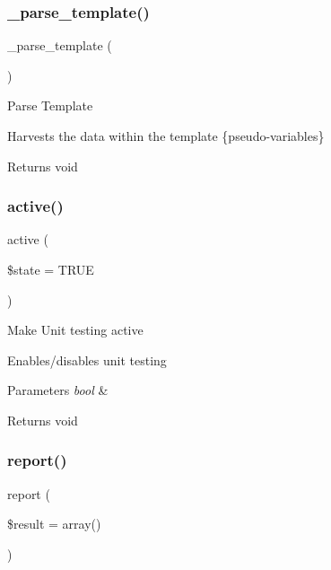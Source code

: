 \subsubsection{\texorpdfstring{\+\_\+parse\+\_\+template()}{\_parse\_template()}}
{\footnotesize\ttfamily \+\_\+parse\+\_\+template (\begin{DoxyParamCaption}{ }\end{DoxyParamCaption})\hspace{0.3cm}{\ttfamily [protected]}}

Parse Template

Harvests the data within the template \{pseudo-\/variables\}

\begin{DoxyReturn}{Returns}
void 
\end{DoxyReturn}
\mbox{\label{class_c_i___unit__test_ac7b3030630fc7dd31513c75cf27c1a8a}} 
\subsubsection{\texorpdfstring{active()}{active()}}
{\footnotesize\ttfamily active (\begin{DoxyParamCaption}\item[{}]{\$state = {\ttfamily TRUE} }\end{DoxyParamCaption})}

Make Unit testing active

Enables/disables unit testing


\begin{DoxyParams}{Parameters}
{\em bool} & \\
\hline
\end{DoxyParams}
\begin{DoxyReturn}{Returns}
void 
\end{DoxyReturn}
\mbox{\label{class_c_i___unit__test_a339c46eabb709c1c492bc264c9634171}} 
\subsubsection{\texorpdfstring{report()}{report()}}
{\footnotesize\ttfamily report (\begin{DoxyParamCaption}\item[{}]{\$result = {\ttfamily array()} }\end{DoxyParamCaption})}

